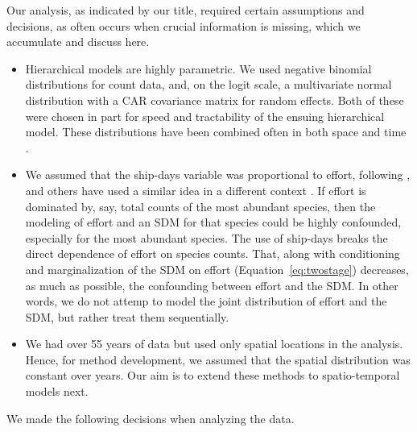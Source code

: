 \documentclass[11pt, titlepage]{article}
\begin{document}
\begin{spacing}{1.9}
\begin{flushleft}
Our analysis, as indicated by our title, required certain assumptions and decisions, as often occurs when crucial information is missing, which we accumulate and discuss here.

\begin{itemize}

  \item Hierarchical models are highly parametric.  We used negative binomial distributions for count data, and, on the logit scale, a multivariate normal distribution with a CAR covariance matrix for random effects. Both of these were chosen in part for speed and tractability of the ensuing hierarchical model.  These distributions have been combined often in both space \citep[e.g.,][]{wakefield_disease_2007, mohebbi_disease_2014} and time \citep[e.g.,][]{zhu_negative_2011, chen_autoregressive_2016}.
  \item We assumed that the ship-days variable was proportional to effort, following \citet{HimesBoorEtAl2012Stellersealion}, and others have used a similar idea in a different context \citep[e.g.,][]{gomes_species_2018}. If effort is dominated by, say, total counts of the most abundant species, then the modeling of effort and an SDM for that species could be highly confounded, especially for the most abundant species.  The use of ship-days breaks the direct dependence of effort on species counts.  That, along with conditioning and marginalization of the SDM on effort (Equation~\ref{eq:twostage}) decreases, as much as possible, the confounding between effort and the SDM.  In other words, we do not attemp to model the joint distribution of effort and the SDM, but rather treat them sequentially.
  \item We had over 55 years of data but used only spatial locations in the analysis. Hence, for method development, we assumed that the spatial distribution was constant over years.  Our aim is to extend these methods to spatio-temporal models next.
\end{itemize}

We made the following decisions when analyzing the data.

\begin{itemize}


\end{itemize}
\end{flushleft}
\end{spacing}
\end{document}
